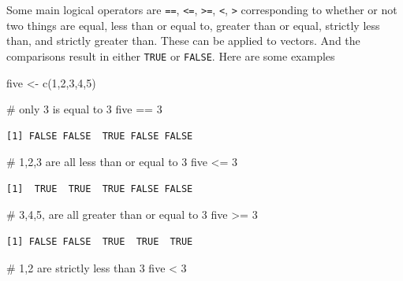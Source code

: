 \documentclass[
  letterpaper,
  DIV=11,
  numbers=noendperiod]{scrreprt}
\newenvironment{Shaded}{\begin{snugshade}}{\end{snugshade}}
\newcommand{\CommentTok}[1]{\textcolor[rgb]{0.37,0.37,0.37}{#1}}
\newcommand{\DecValTok}[1]{\textcolor[rgb]{0.68,0.00,0.00}{#1}}
\newcommand{\FunctionTok}[1]{\textcolor[rgb]{0.28,0.35,0.67}{#1}}
\newcommand{\NormalTok}[1]{\textcolor[rgb]{0.00,0.23,0.31}{#1}}
\newcommand{\OtherTok}[1]{\textcolor[rgb]{0.00,0.23,0.31}{#1}}
\newcommand{\SpecialCharTok}[1]{\textcolor[rgb]{0.37,0.37,0.37}{#1}}
\begin{document}
Some main logical operators are \texttt{==}, \texttt{\textless{}=},
\texttt{\textgreater{}=}, \texttt{\textless{}}, \texttt{\textgreater{}}
corresponding to whether or not two things are equal, less than or equal
to, greater than or equal, strictly less than, and strictly greater
than. These can be applied to vectors. And the comparisons result in
either \texttt{TRUE} or \texttt{FALSE}. Here are some examples

\begin{Shaded}
\begin{Highlighting}[]
\NormalTok{five }\OtherTok{\textless{}{-}} \FunctionTok{c}\NormalTok{(}\DecValTok{1}\NormalTok{,}\DecValTok{2}\NormalTok{,}\DecValTok{3}\NormalTok{,}\DecValTok{4}\NormalTok{,}\DecValTok{5}\NormalTok{)}

\CommentTok{\# only 3 is equal to 3}
\NormalTok{five }\SpecialCharTok{==} \DecValTok{3}
\end{Highlighting}
\end{Shaded}

\begin{verbatim}
[1] FALSE FALSE  TRUE FALSE FALSE
\end{verbatim}

\begin{Shaded}
\begin{Highlighting}[]
\CommentTok{\# 1,2,3 are all less than or equal to 3}
\NormalTok{five }\SpecialCharTok{\textless{}=} \DecValTok{3}
\end{Highlighting}
\end{Shaded}

\begin{verbatim}
[1]  TRUE  TRUE  TRUE FALSE FALSE
\end{verbatim}

\begin{Shaded}
\begin{Highlighting}[]
\CommentTok{\# 3,4,5, are all greater than or equal to 3}
\NormalTok{five }\SpecialCharTok{\textgreater{}=} \DecValTok{3}
\end{Highlighting}
\end{Shaded}

\begin{verbatim}
[1] FALSE FALSE  TRUE  TRUE  TRUE
\end{verbatim}

\begin{Shaded}
\begin{Highlighting}[]
\CommentTok{\# 1,2 are strictly less than 3}
\NormalTok{five }\SpecialCharTok{\textless{}} \DecValTok{3}
\end{Highlighting}
\end{Shaded}
\end{document}
